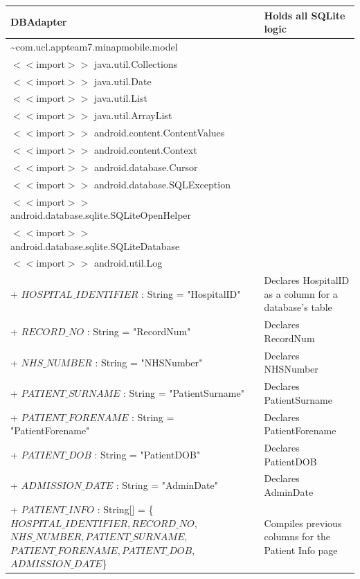 \documentclass[12pt,a4paper,oneside,titlepage]{article}
\begin{document}
\begin{center}
	\begin{tabular}{| p{13cm} | p{5cm} |}
	\hline
	\textbf{DBAdapter} & \textbf{Holds all SQLite logic} \\ \hline
	\textasciitilde com.ucl.appteam7.minapmobile.model & \\ \hline
	$<<$import$>>$ java.util.Collections & \\ \hline
	$<<$import$>>$ java.util.Date & \\ \hline
	$<<$import$>>$ java.util.List & \\ \hline
	$<<$import$>>$ java.util.ArrayList & \\ \hline
	$<<$import$>>$ android.content.ContentValues & \\ \hline
	$<<$import$>>$ android.content.Context & \\ \hline
	$<<$import$>>$ android.database.Cursor & \\ \hline
	$<<$import$>>$ android.database.SQLException & \\ \hline
	$<<$import$>>$ android.database.sqlite.SQLiteOpenHelper & \\ \hline
	$<<$import$>>$ android.database.sqlite.SQLiteDatabase & \\ \hline
	$<<$import$>>$ android.util.Log & \\ \hline \hline
	+ \underline{$HOSPITAL\_IDENTIFIER$} : String = "HospitalID" & Declares HospitalID as a column for a database's table \\ \hline
	+ \underline{$RECORD\_NO$} : String = "RecordNum" & Declares RecordNum \\ \hline
	+ \underline{$NHS\_NUMBER$} : String = "NHSNumber" & Declares NHSNumber \\ \hline
	+ \underline{$PATIENT\_SURNAME$} : String = "PatientSurname" & Declares PatientSurname \\ \hline
	+ \underline{$PATIENT\_FORENAME$} : String = "PatientForename" & Declares PatientForename \\ \hline
	+ \underline{$PATIENT\_DOB$} : String = "PatientDOB" & Declares PatientDOB \\ \hline
	+ \underline{$ADMISSION\_DATE$} : String = "AdminDate" & Declares AdminDate \\ \hline
	+ \underline{$PATIENT\_INFO$} : String[] = \{$HOSPITAL\_IDENTIFIER, RECORD\_NO, $ $NHS\_NUMBER, PATIENT\_SURNAME,$ $PATIENT\_FORENAME, PATIENT\_DOB, $ $ADMISSION\_DATE$\} & Compiles previous columns for the Patient Info page \\ \hline 

\end{tabular}
\end{center}
\end{document}
